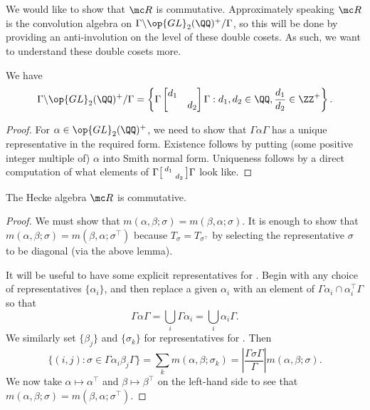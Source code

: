 \documentclass{article}
\begin{document}
We would like to show that $\mc R$ is commutative. Approximately speaking $\mc R$ is the convolution algebra on $\Gamma\backslash\op{GL}_2(\QQ)^+/\Gamma$, so this will be done by providing an anti-involution on the level of these double cosets. As such, we want to understand these double cosets more.
\begin{lemma} \label{lem:gl2-double-coset}
	We have
	\[\Gamma\backslash\op{GL}_2(\QQ)^+/\Gamma=\left\{\Gamma\begin{bmatrix}
		d_1 \\ & d_2
	\end{bmatrix}\Gamma:d_1,d_2\in\QQ,\frac{d_1}{d_2}\in\ZZ^+\right\}.\]
\end{lemma}
\begin{proof}
	For $\alpha\in\op{GL}_2(\QQ)^+$, we need to show that $\Gamma\alpha\Gamma$ has a unique representative in the required form. Existence follows by putting (some positive integer multiple of) $\alpha$ into Smith normal form. Uniqueness follows by a direct computation of what elements of $\Gamma\begin{bsmallmatrix}
		d_1 \\ & d_2
	\end{bsmallmatrix}\Gamma$ look like.
\end{proof}
\begin{proposition}
	The Hecke algebra $\mc R$ is commutative.
\end{proposition}
\begin{proof}
	We must show that $m(\alpha,\beta;\sigma)=m(\beta,\alpha;\sigma)$. It is enough to show that $m(\alpha,\beta;\sigma)=m(\beta,\alpha;\sigma^\intercal)$ because $T_{\sigma}=T_{\sigma^\intercal}$ by selecting the representative $\sigma$ to be diagonal (via the above lemma).

	It will be useful to have some explicit representatives for . Begin with any choice of representatives $\{\alpha_i\}$, and then replace a given $\alpha_i$ with an element of $\Gamma\alpha_i\cap\alpha_i^\intercal\Gamma$ so that
	\[\Gamma\alpha\Gamma=\bigcup_i\Gamma\alpha_i=\bigcup_i\alpha_i\Gamma.\]
	We similarly set $\{\beta_j\}$ and $\{\sigma_k\}$ for representatives for . Then
	\[\{(i,j):\sigma\in\Gamma\alpha_i\beta_j\Gamma\}=\sum_km(\alpha,\beta;\sigma_k)=\left|\frac{\Gamma\sigma\Gamma}\Gamma\right|m(\alpha,\beta;\sigma).\]
	We now take $\alpha\mapsto\alpha^\intercal$ and $\beta\mapsto\beta^\intercal$ on the left-hand side to see that $m(\alpha,\beta;\sigma)=m(\beta,\alpha;\sigma^\intercal)$.
\end{proof}
\end{document}
